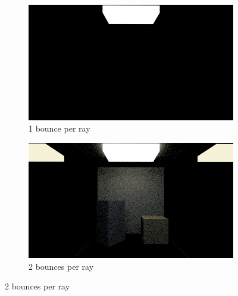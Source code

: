 \documentclass[titlepage,12pt]{report}
\begin{document}
\begin{figure}[H]
	\centering
	\medskip
	\begin{subfigure}{.48\textwidth}
		\centering
		\includegraphics[scale=0.315]{media/mirrors_rect/cornell_mirrors_1.png}
		\caption{1 bounce per ray}
		\label{mr_rect_1}
	\end{subfigure}
	\begin{subfigure}{.48\textwidth}
		\centering
		\includegraphics[scale=0.315]{media/mirrors_rect/cornell_mirrors_2.png}
		\caption{2 bounces per ray}
		\label{mr_rect_2}
	\end{subfigure}
	

\end{figure}
\end{document}
